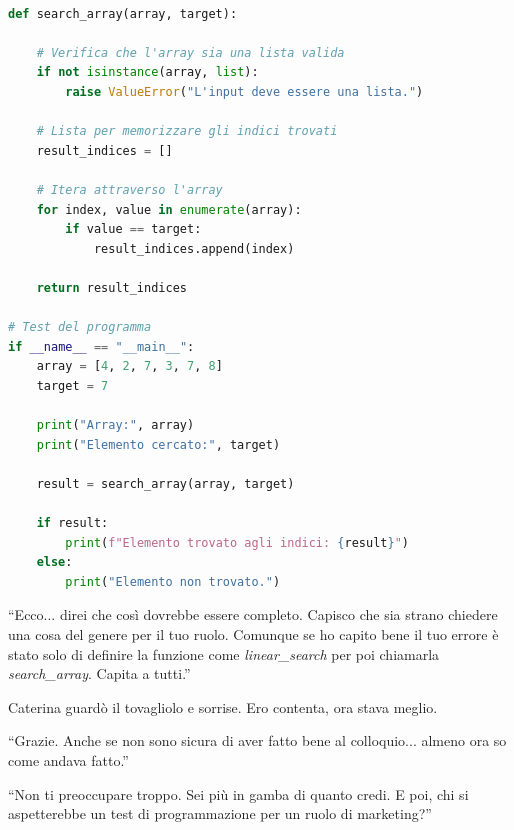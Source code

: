 \begin{tcolorbox}[colback=white!95!blue!5, colframe=blue!75!black, title=\textbf{Algoritmo di Ricerca Python}, fonttitle=\bfseries]
  \begin{lstlisting}[language=Python, caption=\textit{Bozza dell'algoritmo di ricerca}]

def search_array(array, target):
    
    # Verifica che l'array sia una lista valida
    if not isinstance(array, list):
        raise ValueError("L'input deve essere una lista.")

    # Lista per memorizzare gli indici trovati
    result_indices = []

    # Itera attraverso l'array
    for index, value in enumerate(array):
        if value == target:
            result_indices.append(index)

    return result_indices

# Test del programma
if __name__ == "__main__":
    array = [4, 2, 7, 3, 7, 8]
    target = 7

    print("Array:", array)
    print("Elemento cercato:", target)

    result = search_array(array, target)

    if result:
        print(f"Elemento trovato agli indici: {result}")
    else:
        print("Elemento non trovato.")
 \end{lstlisting}
\end{tcolorbox}

\begin{dialogue}
 \enquote{Ecco... direi che così dovrebbe essere completo. Capisco che sia strano chiedere una cosa del genere per il tuo ruolo. Comunque se ho capito bene il tuo errore è stato solo di definire la funzione come \textit{linear\_search} per poi chiamarla \textit{search\_array}. Capita a tutti.}
\end{dialogue}

Caterina guardò il tovagliolo e sorrise. Ero contenta, ora stava meglio.

\begin{dialogue}
 \enquote{Grazie. Anche se non sono sicura di aver fatto bene al colloquio... almeno ora so come andava fatto.}
\end{dialogue}



\begin{dialogue}
 \enquote{Non ti preoccupare troppo. Sei più in gamba di quanto credi. E poi, chi si aspetterebbe un test di programmazione per un ruolo di marketing?}
\end{dialogue}

